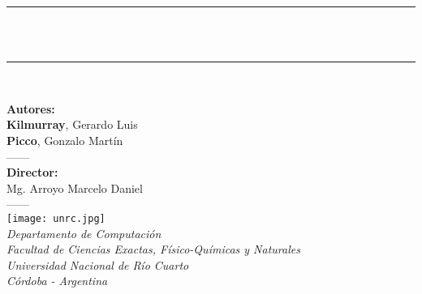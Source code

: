 \newcommand{\HRule}{\rule{\linewidth}{0.6mm}}
\begin{titlepage}

\begin{center}


\vspace*{2cm}

  {\Large{\textbf{}}}
\vspace*{0.4cm}
\HRule \\
  \vspace*{0.2cm}
  {\Huge\textbf{\maggen\\}}
  \vspace*{0.2cm}
 
\HRule \\[0.5cm]

\vspace*{2cm}

\large{\textbf{Autores:}\\ \textbf{Kilmurray}, Gerardo Luis\\ \textbf{Picco}, Gonzalo Martín\\}
\vspace*{0.6cm}
{------\\}
\vspace*{0.6cm}
\large{\textbf{Director:}\\ Mg. Arroyo Marcelo Daniel\\}
\vspace*{1cm}
{------\\}
\vspace*{2cm}
 \texttt{[image: unrc.jpg]}\\
\vspace*{0.5cm}
\normalsize{\textit{Departamento de Computación\\
                    Facultad de Ciencias Exactas, Físico-Químicas y Naturales\\
                    Universidad Nacional de Río Cuarto\\
                    Córdoba - Argentina}}
\end{center}
\end{titlepage}
\sloppy

\titlepage
